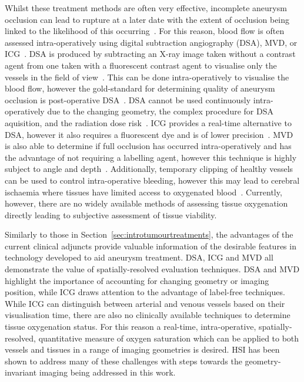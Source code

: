 Whilst these treatment methods are often very effective, incomplete aneurysm occlusion can lead to rupture at a later date with the extent of occlusion being linked to the likelihood of this occurring~\citep{Toth2018}. For this reason, blood flow is often assessed intra-operatively using digital subtraction angiography (DSA), MVD, or ICG~\citep{Norat2019}. DSA is produced by subtracting an X-ray image taken without a contrast agent from one taken with a fluorescent contrast agent to visualise only the vessels in the field of view~\citep{Radiopia2022}. This can be done intra-operatively to visualise the blood flow, however the gold-standard for determining quality of aneurysm occlusion is post-operative DSA~\citep{Marbacher2020}. DSA cannot be used continuously intra-operatively due to the changing geometry, the complex procedure for DSA aquisition, and the radiation dose risk~\citep{Radiopia2022, Derdeyn1999}. ICG provides a real-time alternative to DSA, however it also requires a fluorescent dye and is of lower precision~\citep{Norat2019, Anania2023}. MVD is also able to determine if full occlusion has occurred intra-operatively and has the advantage of not requiring a labelling agent, however this technique is highly subject to angle and depth~\citep{Anania2023}. Additionally, temporary clipping of healthy vessels can be used to control intra-operative bleeding, however this may lead to cerebral ischaemia where tissues have limited access to oxygenated blood~\citep{Doron2022}. Currently, however, there are no widely available methods of assessing tissue oxygenation directly leading to subjective assessment of tissue viability. 

Similarly to those in Section~\ref{sec:introtumourtreatments}, the advantages of the current clinical adjuncts provide valuable information of the desirable features in technology developed to aid aneurysm treatment. DSA, ICG and MVD all demonstrate the value of spatially-resolved evaluation techniques. DSA and MVD highlight the importance of accounting for changing geometry or imaging position, while ICG draws attention to the advantage of label-free techniques. While ICG can distinguish between arterial and venous vessels based on their visualisation time, there are also no clinically available techniques to determine tissue oxygenation status. For this reason a real-time, intra-operative, spatially-resolved, quantitative measure of oxygen saturation which can be applied to both vessels and tissues in a range of imaging geometries is desired. HSI has been shown to address many of these challenges with steps towards the geometry-invariant imaging being addressed in this work. 

